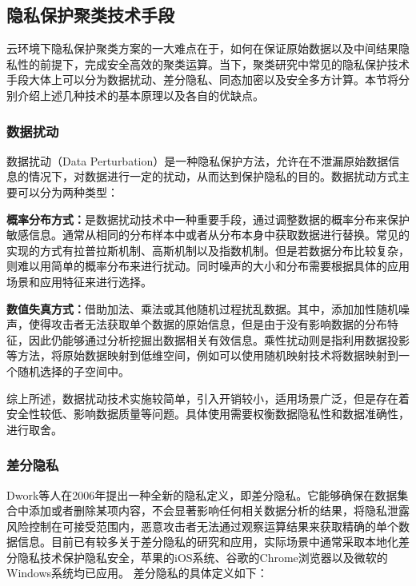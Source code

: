 \subsection{隐私保护聚类技术手段}
云环境下隐私保护聚类方案的一大难点在于，如何在保证原始数据以及中间结果隐私性的前提下，完成安全高效的聚类运算。当下，聚类研究中常见的隐私保护技术手段大体上可以分为数据扰动、差分隐私、同态加密以及安全多方计算。本节将分别介绍上述几种技术的基本原理以及各自的优缺点。

\subsubsection{数据扰动}
数据扰动（Data Perturbation）是一种隐私保护方法，允许在不泄漏原始数据信息的情况下，对数据进行一定的扰动，从而达到保护隐私的目的。数据扰动方式主要可以分为两种类型：

\begin{compactitem}
	\item \textbf{概率分布方式：}是数据扰动技术中一种重要手段，通过调整数据的概率分布来保护敏感信息。通常从相同的分布样本中或者从分布本身中获取数据进行替换。常见的实现的方式有拉普拉斯机制、高斯机制以及指数机制。但是若数据分布比较复杂，则难以用简单的概率分布来进行扰动。同时噪声的大小和分布需要根据具体的应用场景和应用特征来进行选择。
	\item \textbf{数值失真方式：}借助加法、乘法或其他随机过程扰乱数据。其中，添加加性随机噪声，使得攻击者无法获取单个数据的原始信息，但是由于没有影响数据的分布特征，因此仍能够通过分析挖掘出数据相关有效信息。乘性扰动则是指利用数据投影等方法，将原始数据映射到低维空间，例如可以使用随机映射技术将数据映射到一个随机选择的子空间中。
\end{compactitem}

综上所述，数据扰动技术实施较简单，引入开销较小，适用场景广泛，但是存在着安全性较低、影响数据质量等问题。具体使用需要权衡数据隐私性和数据准确性，进行取舍。

\subsubsection{差分隐私}
Dwork等人\cite{dwork2006differential}在2006年提出一种全新的隐私定义，即差分隐私。它能够确保在数据集合中添加或者删除某项内容，不会显著影响任何相关数据分析的结果\cite{dwork2008differential}，将隐私泄露风险控制在可接受范围内，恶意攻击者无法通过观察运算结果来获取精确的单个数据信息。目前已有较多关于差分隐私的研究和应用，实际场景中通常采取本地化差分隐私技术保护隐私安全，苹果的iOS系统\cite{team2017learning}、谷歌的Chrome浏览器\cite{erlingsson2014rappor}以及微软的Windows系统\cite{ding2017collecting}均已应用。
差分隐私的具体定义\cite{dwork2011firm}如下：

